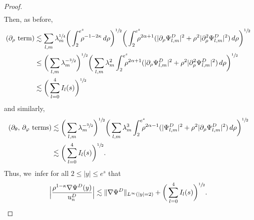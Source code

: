 \documentclass[10pt]{amsart}
\theoremstyle{plain}
\theoremstyle{definition}
\begin{document}
\begin{proof}
\[\begin{aligned}
\end{aligned}
\]
Then, as before,
\[
\begin{aligned}
(\partial_\rho \text{ term}) &\lesssim\sum_{l,m}\lambda_m^{\sfrac{1}{4}}\bigg(\int_2^{e^s}\hspace*{-2.5mm} \rho^{-1-2\kappa}\,d\rho\bigg)^{\sfrac{1}{2}}\bigg(\int_2^{e^s}\hspace*{-2.5mm}\rho^{2\alpha+1}(|\partial_\rho\Psi_{l,m}^D|^2+\rho^2|\partial_\rho^2\Psi_{l,m}^D|^2)\,d\rho\bigg)^{\sfrac{1}{2}}\\
&\le \bigg(\sum_{l,m} \lambda_m^{-\sfrac{3}{2}}\bigg)^{\sfrac{1}{2}}\bigg(\sum_{l,m}\lambda_m^2\int_2^{e^s}\hspace*{-2.5mm}\rho^{2\alpha+1}(|\partial_\rho\Psi_{l,m}^D|^2+\rho^2|\partial_\rho^2\Psi_{l,m}^D|^2)\,d\rho\bigg)^{\sfrac{1}{2}}\\
&\lesssim \bigg(\sum_{l=0}^4I_l(s)\bigg)^{\sfrac{1}{2}}
\end{aligned}
\]
and similarly,\vspace*{-3pt}
\[
\begin{aligned}
(\partial_\theta,\,\partial_\varphi\text{ terms})
&\lesssim\bigg(\sum_{l,m} \lambda_m^{-\sfrac{3}{2}}\bigg)^{\sfrac{1}{2}}\bigg(\sum_{l,m}\lambda_m^3\int_2^{e^s}\hspace*{-2.5mm}\rho^{2\alpha-1}(|\Psi_{l,m}^D|^2+\rho^2|\partial_\rho\Psi_{l,m}^D|^2)\,d\rho\bigg)^{\sfrac{1}{2}}\\
&\lesssim\bigg(\sum_{l=0}^4I_l(s)\bigg)^{\sfrac{1}{2}}.
\end{aligned}
\]
Thus, we~infer for all $2\le |y|\le e^s$ that\vspace*{-3pt}
\[
\Big|\frac{\rho^{1-\kappa}\nabla\Psi^D(y)}{u_n^D}\Big|\lesssim
\Vert \nabla\Psi^D\Vert_{L^\infty(|y|=2)}+\bigg(\sum_{l=0}^4I_l(s)\bigg)^{\sfrac{1}{2}}.
\]


\end{proof}
\end{document}
